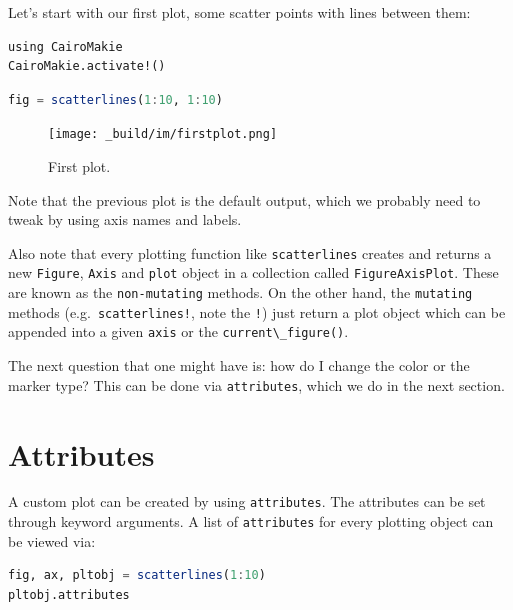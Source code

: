 \documentclass[
  notoc %
]{tufte-book}
\newcommand{\passthrough}[1]{#1}
\begin{document}
Let's start with our first plot, some scatter points with lines between
them:

\begin{lstlisting}
using CairoMakie
CairoMakie.activate!()
\end{lstlisting}

\begin{lstlisting}[language=Julia]
fig = scatterlines(1:10, 1:10)
\end{lstlisting}

\begin{figure}
\hypertarget{fig:firstplot}{%
\centering
\texttt{[image: \_build/im/firstplot.png]}
\caption{First plot.}\label{fig:firstplot}
}
\end{figure}

Note that the previous plot is the default output, which we probably
need to tweak by using axis names and labels.

Also note that every plotting function like
\passthrough{\lstinline!scatterlines!} creates and returns a new
\passthrough{\lstinline!Figure!}, \passthrough{\lstinline!Axis!} and
\passthrough{\lstinline!plot!} object in a collection called
\passthrough{\lstinline!FigureAxisPlot!}. These are known as the
\passthrough{\lstinline!non-mutating!} methods. On the other hand, the
\passthrough{\lstinline!mutating!} methods
(e.g.~\passthrough{\lstinline"scatterlines!"}, note the
\passthrough{\lstinline"!"}) just return a plot object which can be
appended into a given \passthrough{\lstinline!axis!} or the
\passthrough{\lstinline!current\_figure()!}.

The next question that one might have is: how do I change the color or
the marker type? This can be done via
\passthrough{\lstinline!attributes!}, which we do in the next section.

\hypertarget{sec:datavisMakie_attributes}{%
\section{Attributes}\label{sec:datavisMakie_attributes}}

A custom plot can be created by using
\passthrough{\lstinline!attributes!}. The attributes can be set through
keyword arguments. A list of \passthrough{\lstinline!attributes!} for
every plotting object can be viewed via:

\begin{lstlisting}[language=Julia]
fig, ax, pltobj = scatterlines(1:10)
pltobj.attributes
\end{lstlisting}
\end{document}

